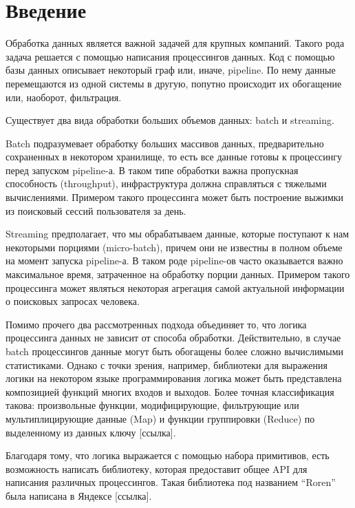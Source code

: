 \section{Введение}
\label{sec:intro}

Обработка данных является важной задачей для крупных компаний. Такого рода задача решается с помощью написания процессингов данных. Код с помощью базы данных описывает некоторый граф или, иначе, pipeline. По нему данные перемещаются из одной системы в другую, попутно происходит их обогащение или, наоборот, фильтрация.

Существует два вида обработки больших объемов данных: batch и streaming.

Batch подразумевает обработку больших массивов данных, предварительно сохраненных в некотором хранилище, то есть все данные готовы к процессингу перед запуском pipeline-а. В таком типе обработки важна пропускная способность (throughput), инфраструктура должна справляться с тяжелыми вычислениями. Примером такого процессинга может быть построение выжимки из поисковый сессий пользователя за день.

Streaming предполагает, что мы обрабатываем данные, которые поступают к нам некоторыми порциями (micro-batch), причем они не известны в полном объеме на момент запуска pipeline-а. В таком роде pipeline-ов часто оказывается важно максимальное время, затраченное на обработку порции данных. Примером такого процессинга может являться некоторая агрегация самой актуальной информации о поисковых запросах человека.

Помимо прочего два рассмотренных подхода объединяет то, что логика процессинга данных не зависит от способа обработки. Действительно, в случае batch процессингов данные могут быть обогащены более сложно вычислимыми статистиками. Однако с точки зрения, например, библиотеки для выражения логики на некотором языке программирования логика может быть представлена композицией функций многих входов и выходов. Более точная классификация такова: произвольные функции, модифицирующие, фильтрующие или мультиплицирующие данные (Map) и функции группировки (Reduce) по выделенному из данных ключу [ссылка].

Благодаря тому, что логика выражается с помощью набора примитивов, есть возможность написать библиотеку, которая предоставит общее API для написания различных процессингов. Такая библиотека под названием “Roren” была написана в Яндексе [ссылка].

\newpage


\newpage


\newpage

